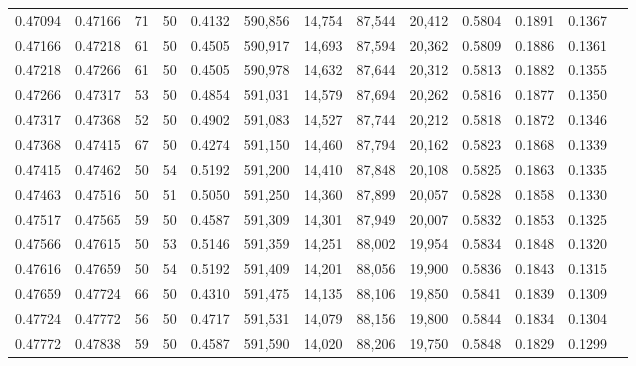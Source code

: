 \begin{tabular}{rrrrrrrrrrrrr}
0.47094 & 0.47166 &    71 &  50 &                                     0.4132 & 590,856 &  14,754 &  87,544 &  20,412 & 0.5804 & 0.1891 & 0.1367 \\
0.47166 & 0.47218 &    61 &  50 &                                     0.4505 & 590,917 &  14,693 &  87,594 &  20,362 & 0.5809 & 0.1886 & 0.1361 \\
0.47218 & 0.47266 &    61 &  50 &                                     0.4505 & 590,978 &  14,632 &  87,644 &  20,312 & 0.5813 & 0.1882 & 0.1355 \\
0.47266 & 0.47317 &    53 &  50 &                                     0.4854 & 591,031 &  14,579 &  87,694 &  20,262 & 0.5816 & 0.1877 & 0.1350 \\
0.47317 & 0.47368 &    52 &  50 &                                     0.4902 & 591,083 &  14,527 &  87,744 &  20,212 & 0.5818 & 0.1872 & 0.1346 \\
0.47368 & 0.47415 &    67 &  50 &                                     0.4274 & 591,150 &  14,460 &  87,794 &  20,162 & 0.5823 & 0.1868 & 0.1339 \\
0.47415 & 0.47462 &    50 &  54 &                                     0.5192 & 591,200 &  14,410 &  87,848 &  20,108 & 0.5825 & 0.1863 & 0.1335 \\
0.47463 & 0.47516 &    50 &  51 &                                     0.5050 & 591,250 &  14,360 &  87,899 &  20,057 & 0.5828 & 0.1858 & 0.1330 \\
0.47517 & 0.47565 &    59 &  50 &                                     0.4587 & 591,309 &  14,301 &  87,949 &  20,007 & 0.5832 & 0.1853 & 0.1325 \\
0.47566 & 0.47615 &    50 &  53 &                                     0.5146 & 591,359 &  14,251 &  88,002 &  19,954 & 0.5834 & 0.1848 & 0.1320 \\
0.47616 & 0.47659 &    50 &  54 &                                     0.5192 & 591,409 &  14,201 &  88,056 &  19,900 & 0.5836 & 0.1843 & 0.1315 \\
0.47659 & 0.47724 &    66 &  50 &                                     0.4310 & 591,475 &  14,135 &  88,106 &  19,850 & 0.5841 & 0.1839 & 0.1309 \\
0.47724 & 0.47772 &    56 &  50 &                                     0.4717 & 591,531 &  14,079 &  88,156 &  19,800 & 0.5844 & 0.1834 & 0.1304 \\
0.47772 & 0.47838 &    59 &  50 &                                     0.4587 & 591,590 &  14,020 &  88,206 &  19,750 & 0.5848 & 0.1829 & 0.1299 \\

\end{tabular}
